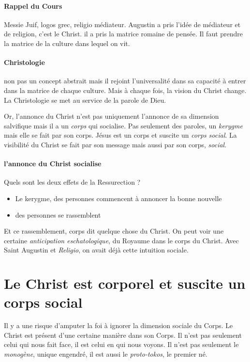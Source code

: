 \paragraph{Rappel du Cours} Messie Juif, logos grec, religio médiateur. Augustin a pris l'idée de médiateur et de religion, c'est le Christ. il a pris la matrice romaine de pensée. Il faut prendre la matrice de la culture dans lequel on vit.

\paragraph{Christologie} non pas un concept abstrait mais il rejoint l'universalité dans sa capacité à entrer dans la matrice de chaque culture. Mais à chaque fois, la vision du Christ change. La Christologie se met au service de la parole de Dieu.

Or, l'annonce du Christ n'est pas uniquement l'annonce de sa dimension salvifique mais il a un \textit{corps } qui socialise. Pas seulement des paroles, un \textit{kerygme} mais elle se fait par son corps.
Jésus est un corps et suscite un \textit{corps social}. La visibilité du Christ se fait par son message mais aussi par son corps, \textit{social}.

\paragraph{l'annonce du Christ socialise}
Quels sont les deux effets de la Ressurection ? 
\begin{itemize}
    \item Le kerygme, des personnes commencent à annoncer la bonne nouvelle
    \item des personnes se rassemblent
\end{itemize}

Et ce rassemblement, corps dit quelque chose du Christ.
On peut voir une certaine \textit{anticipation eschatologique}, du Royaume dans le corps du Christ. Avec Saint Augustin et \textit{Religio}, on avait déjà cette intuition sociale.

\section{Le Christ est corporel et suscite un corps social }


 Il y a une risque d'amputer la foi à ignorer la dimension sociale du Corps. Le Christ est présent d'une certaine manière dans son Corps. Il n'est pas seulement celui qui nous fait face, il est celui en qui nous voyons. Il n'est pas seulement le \textit{monogène}, unique engendré, il est aussi le \textit{proto-tokos}, le premier né.
 
